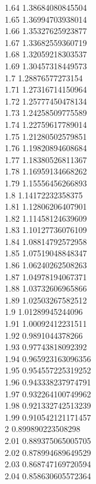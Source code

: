 {1.64	1.38684080845504\\
1.65	1.36994703938014\\
1.66	1.35327625923877\\
1.67	1.33682559360719\\
1.68	1.32059218303537\\
1.69	1.30457318449573\\
1.7	1.28876577273154\\
1.71	1.27316714150964\\
1.72	1.25777450478134\\
1.73	1.24258509775589\\
1.74	1.22759617789014\\
1.75	1.21280502579851\\
1.76	1.19820894608684\\
1.77	1.18380526811367\\
1.78	1.16959134668262\\
1.79	1.15556456266893\\
1.8	1.14172232358375\\
1.81	1.12806206407901\\
1.82	1.11458124639609\\
1.83	1.10127736076109\\
1.84	1.08814792572958\\
1.85	1.07519048848347\\
1.86	1.06240262508263\\
1.87	1.04978194067371\\
1.88	1.03732606965866\\
1.89	1.02503267582512\\
1.9	1.01289945244096\\
1.91	1.00092412231511\\
1.92	0.9891044378266\\
1.93	0.97743818092392\\
1.94	0.965923163096356\\
1.95	0.954557225319252\\
1.96	0.943338237974791\\
1.97	0.932264100749962\\
1.98	0.921332742513239\\
1.99	0.910542121171457\\
2	0.899890223508298\\
2.01	0.889375065005705\\
2.02	0.878994689649529\\
2.03	0.868747169720594\\
2.04	0.858630605572364\\
}
